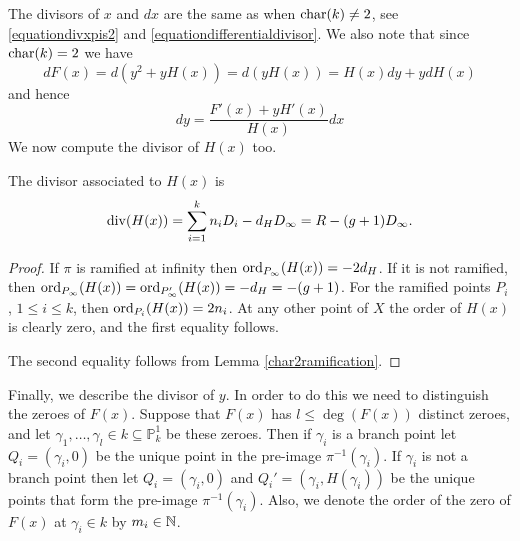 The divisors of $x$ and $dx$ are the same as when $\operatorname{char}(k) \neq 2$, see \eqref{equationdivxpis2} and \eqref{equationdifferentialdivisor}.
We also note that since $\operatorname{char}(k) = 2$ we have
    \[
    dF(x) = d(y^2 + yH(x)) = d(yH(x)) = H(x)dy + ydH(x)
    \]
    and hence
    \begin{equation}\label{equationdivisorofdypis2}
    dy = \frac{F'(x) + yH'(x)}{H(x)}dx
    \end{equation}
We now compute the divisor of $H(x)$ too.



    \begin{lem}\label{h(x)char2}
    The divisor associated to $H(x)$ is
        \[
        \operatorname{div} (H(x)) = \sum_{i=1}^k n_i D_i - d_HD_\infty = R - (g+1)D_\infty.
        \]
    \end{lem}
    \begin{proof}
    If $\pi$ is ramified at infinity then $\operatorname{ord}_{P_{\infty}}(H(x)) = - 2d_H$.
    If it is not ramified, then $\operatorname{ord}_{P_{\infty}}(H(x)) = \operatorname{ord}_{P_{\infty}'}(H(x))=-d_H= -(g+1)$.
    For the ramified points $P_i$, $1\leq i \leq k$, then $ \operatorname{ord}_{P_i}(H(x))= 2n_i$.
    At any other point of $X$ the order of $H(x)$ is clearly zero, and the first equality follows.

    The second equality follows from Lemma \ref{char2ramification}.
    \end{proof}
    
Finally, we describe the divisor of $y$.
In order to do this we need to distinguish the zeroes of $F(x)$.
Suppose that $F(x)$ has $l \leq \deg(F(x))$ distinct zeroes, and let $\gamma_1, \ldots, \gamma_l \in k \subseteq \mathbb P_k^1$ be these zeroes.
Then if $\gamma_i$ is a branch point let $Q_i = (\gamma_i, 0)$ be the unique point in the pre-image $\pi^{-1}(\gamma_i)$.
If $\gamma_i$ is not a branch point then let $Q_i = (\gamma_i, 0)$ and $Q_i' = (\gamma_i, H(\gamma_i))$ be the unique points that form the pre-image $\pi^{-1}(\gamma_i)$.
Also, we denote the order of the zero of $F(x)$ at $\gamma_i \in k$ by $m_i \in {\mathbb N}$.


